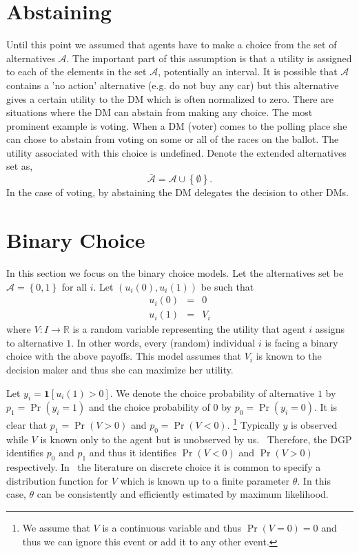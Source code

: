 \documentclass{article}
\begin{document}
\section{Abstaining}

Until this point we assumed that agents have to make a choice from the set
of alternatives $\mathcal{A}$. The important part of this assumption is that
a utility is assigned to each of the elements in the set $\mathcal{A}$,
potentially an interval. It is possible that $\mathcal{A}$ contains a 'no
action' alternative (e.g. do not buy any car) but this alternative gives a
certain utility to the DM which is often normalized to zero. There are
situations where the DM can abstain from making any choice. The most
prominent example is voting. When a DM (voter) comes to the polling place
she can chose to abstain from voting on some or all of the races on the
ballot. The utility associated with this choice is undefined. Denote the
extended alternatives set as,%
\begin{equation*}
\mathcal{\bar{A}}=\mathcal{A}\cup \left\{ \emptyset \right\} .
\end{equation*}%
In the case of voting, by abstaining the DM delegates the decision to other
DMs.

\section{Binary Choice}

In this section we focus on the binary choice models. Let the alternatives
set be $\mathcal{A}=\left\{ 0,1\right\} $ for all $i$. Let $%
(u_{i}(0),u_{i}(1))$ be such that%
\begin{eqnarray*}
u_{i}\left( 0\right) &=&0 \\
u_{i}\left( 1\right) &=&V_{i}
\end{eqnarray*}%
where $V:I\rightarrow 
\mathbb{R}
$ is a random variable representing the utility that agent $i$ assigns to
alternative $1$. In other words, every (random) individual $i$ is facing a
binary choice with the above payoffs. This model assumes that $V_{i}$ is
known to the decision maker and thus she can maximize her utility.

Let $y_{i}=\mathbf{1}\left[ u_{i}(1)>0\right] $. We denote the choice
probability of alternative $1$ by $p_{1}=\Pr \left( y_{i}=1\right) $ and the
choice probability of $0$ by $p_{0}=\Pr \left( y_{i}=0\right) $. It is clear
that $p_{1}=\Pr \left( V>0\right) $ and $p_{0}=\Pr \left( V<0\right) $.%
\footnote{%
We assume that $V$ is a continuous variable and thus $\Pr \left( V=0\right)
=0$ and thus we can ignore this event or add it to any other event.}
Typically $y$ is observed while $V$ is known only to the agent but is
unobserved by us. \ Therefore, the DGP identifies $p_{0}$ and $p_{1}$ and
thus it identifies $\Pr \left( V<0\right) $ and $\Pr \left( V>0\right) $
respectively. In \ the literature on discrete choice it is common to specify
a distribution function for $V$ which is known up to a finite parameter $%
\theta $. In this case, $\theta $ can be consistently and efficiently
estimated by maximum likelihood.
\end{document}
